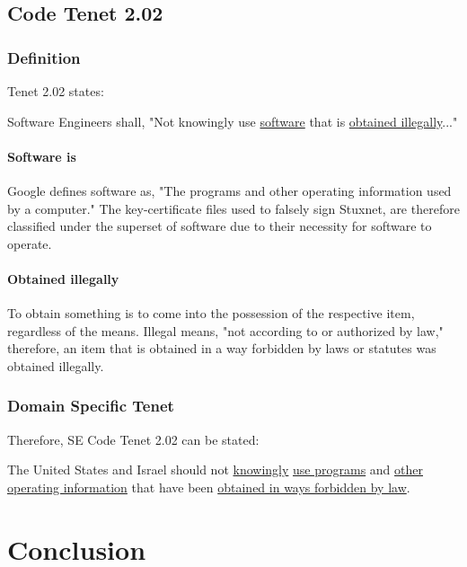 \documentclass[12pt]{article}
\begin{document}
\begin{multicols}{2}

\subsection{Code Tenet 2.02}

\subsubsection{Definition}

Tenet 2.02 states:
\begin{framed}
Software Engineers shall, "Not knowingly use \underline{software} that is \underline{obtained illegally}..."\cite{softwareEngineeringCodeOfEthics}
\end{framed}

\paragraph{Software is}
Google defines software as, "The programs and other operating information used by a computer."\cite{softwareDefinition} The key-certificate files used to falsely sign Stuxnet, are therefore classified under the superset of software due to their necessity for software to operate.

\paragraph{Obtained illegally}
To obtain something is to come into the possession of the respective item, regardless of the means. Illegal means, "not according to or authorized by law," therefore, an item that is obtained in a way forbidden by laws or statutes was obtained illegally.\cite{illegalDefinition}

\subsubsection{Domain Specific Tenet}

Therefore, SE Code Tenet 2.02 can be stated:
\begin{framed}
The United States and Israel should not \ul{knowingly} \ul{use programs} and \ul{other operating information} that have been \ul{obtained in ways forbidden by law}. 
\end{framed}


\section{Conclusion}


\end{multicols}
\end{document}
